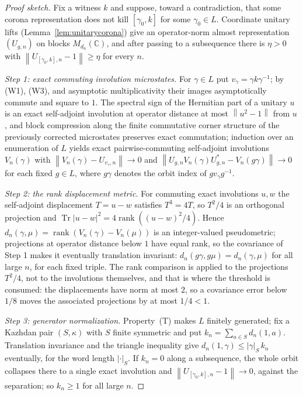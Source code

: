 \documentclass[11pt]{amsart}
\theoremstyle{definition}
\theoremstyle{remark}
\theoremstyle{plain}
\newcommand{\C}{\mathbb C}
\newcommand{\opnorm}[1]{\left\lVert #1\right\rVert}
\begin{document}
\begin{proof}[Proof sketch]
Fix a witness $k$ and suppose, toward a contradiction, that some corona
representation does not kill $[\gamma_0,k]$ for some $\gamma_0\in L$.
Coordinate unitary lifts (Lemma~\ref{lem:unitarycorona}) give an
operator-norm almost representation $(U_{g,n})$ on blocks
$M_{d_n}(\C)$, and after passing to a subsequence there is $\eta>0$
with $\opnorm{U_{[\gamma_0,k],n}-1}\ge\eta$ for every $n$.

\emph{Step 1: exact commuting involution microstates.}  For
$\gamma\in L$ put $v_\gamma=\gamma k\gamma^{-1}$; by (W1), (W3), and
asymptotic multiplicativity their images asymptotically commute and
square to $1$.  The spectral sign of the Hermitian part of a unitary
$u$ is an exact self-adjoint involution at operator distance at most
$\opnorm{u^2-1}$ from $u$, and block compression along the finite
commutative corner structure of the previously corrected microstates
preserves exact commutation; induction over an enumeration of $L$
yields exact pairwise-commuting self-adjoint involutions $V_n(\gamma)$
with $\opnorm{V_n(\gamma)-U_{v_\gamma,n}}\to0$ and
$\opnorm{U_{g,n}V_n(\gamma)U_{g,n}^{*}-V_n(g\gamma)}\to0$ for each
fixed $g\in L$, where $g\gamma$ denotes the orbit index of
$gv_\gamma g^{-1}$.

\emph{Step 2: the rank displacement metric.}  For commuting exact
involutions $u,w$ the self-adjoint displacement $T=u-w$ satisfies
$T^3=4T$, so $T^2/4$ is an orthogonal projection and
$\operatorname{Tr}|u-w|^2=4\operatorname{rank}((u-w)^2/4)$.  Hence
$d_n(\gamma,\mu)=\operatorname{rank}(V_n(\gamma)-V_n(\mu))$ is an
integer-valued pseudometric; projections at operator distance below
$1$ have equal rank, so the covariance of Step 1 makes it eventually
translation invariant: $d_n(g\gamma,g\mu)=d_n(\gamma,\mu)$ for all
large $n$, for each fixed triple.  The rank comparison is applied to
the projections $T^2/4$, not to the involutions themselves, and that
is where the threshold is consumed: the displacements have norm at
most $2$, so a covariance error below $1/8$ moves the associated
projections by at most $1/4<1$.

\emph{Step 3: generator normalization.}  Property~\textup{(T)} makes
$L$ finitely generated; fix a Kazhdan pair $(S,\kappa)$ with $S$
finite symmetric and put $k_n=\sum_{a\in S}d_n(1,a)$.  Translation
invariance and the triangle inequality give
$d_n(1,\gamma)\le|\gamma|_S\,k_n$ eventually, for the word length
$|\cdot|_S$.  If $k_n=0$ along a subsequence, the whole orbit
collapses there to a single exact involution and
$\opnorm{U_{[\gamma_0,k],n}-1}\to0$, against the separation; so
$k_n\ge1$ for all large $n$.


\end{proof}
\end{document}
